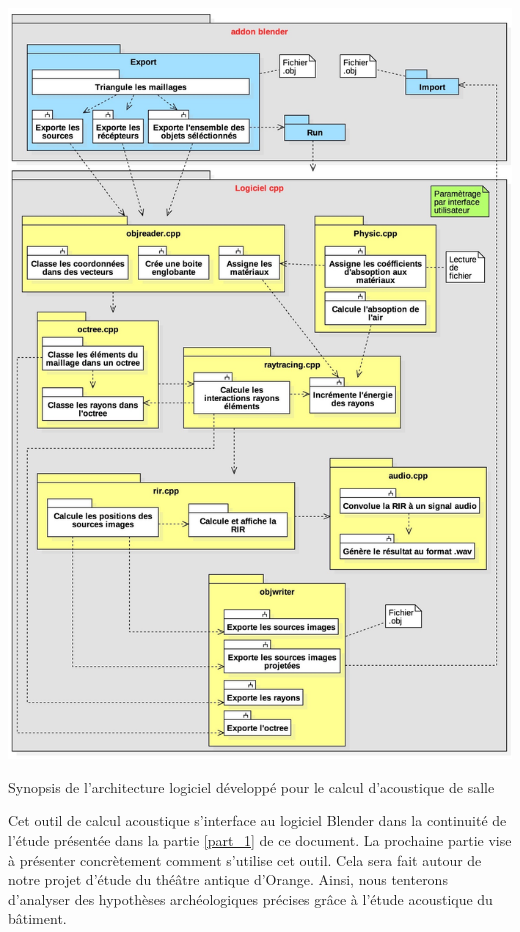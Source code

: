 \begin{figureth}
	\includegraphics[width=\linewidth]{images/synopsis}
	\caption{Synopsis de l'architecture logiciel développé pour le calcul d'acoustique de salle}
	\label{synopsis}
\end{figureth}

Cet outil de calcul acoustique s'interface au logiciel Blender dans la continuité de l'étude présentée dans la partie \ref{part_1} de ce document. La prochaine partie vise à présenter concrètement comment s'utilise cet outil. Cela sera fait autour de notre projet d'étude du théâtre antique d'Orange. Ainsi, nous tenterons d'analyser des hypothèses archéologiques précises grâce à l'étude acoustique du bâtiment.

